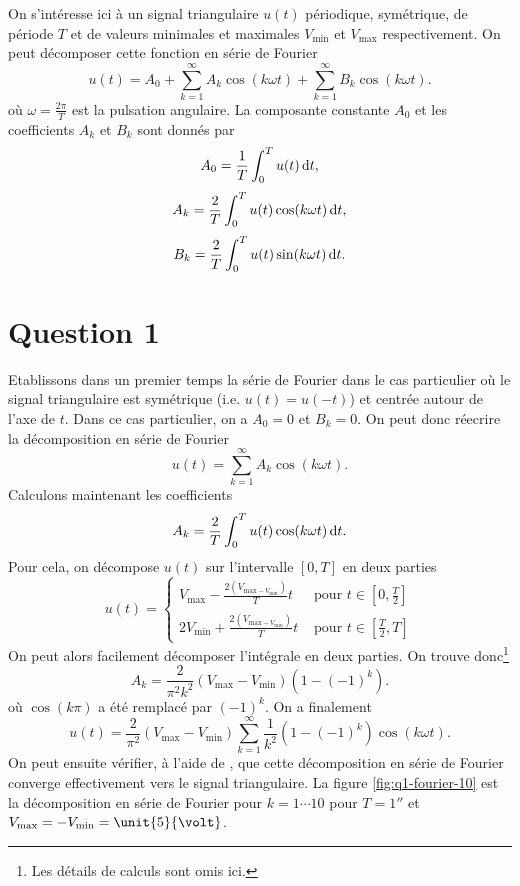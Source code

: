

On s'intéresse ici à un signal triangulaire $u(t)$
périodique, symétrique, de période $T$ et de valeurs 
minimales et maximales $V_{\text{min}}$ et $V_{\text{max}}$
respectivement. On peut décomposer cette fonction
en série de Fourier
\[ u(t) = A_0 + \sum_{k=1}^{\infty} A_k\cos(k\omega t)
+ \sum_{k=1}^{\infty} B_k\cos(k\omega t). \]
où $\omega = \frac{2\pi}{T}$ est la pulsation angulaire.
La composante constante $A_0$ et les coefficients $A_k$
et $B_k$ sont donnés par 
\[ A_0 = \frac{1}{T} \int_0^T u(t)\operatorname{d}\! t,\]
\[ A_k = \frac{2}{T} \int_0^T u(t)\cos(k\omega t)\operatorname{d}\! t,\]
\[ B_k = \frac{2}{T} \int_0^T u(t)\sin(k\omega t)\operatorname{d}\! t.\]

\section{Question 1}
Etablissons dans un premier temps la série de Fourier
dans le cas particulier où le signal triangulaire
est symétrique (i.e. $u(t) = u(-t)$) et centrée autour
de l'axe de $t$. Dans ce cas particulier, on a $A_0 = 0$
et $B_k = 0$. On peut donc réecrire la décomposition
en série de Fourier 
\[ u(t) = \sum_{k=1}^{\infty} A_k\cos(k\omega t).\]
Calculons maintenant les coefficients
\[ A_k = \frac{2}{T} \int_0^T u(t)\cos(k\omega t)\operatorname{d}\! t.\]
Pour cela, on décompose $u(t)$ sur l'intervalle $[0,T]$
en deux parties
\[ u(t) =
	\left\{
		\begin{array}{rl}
			V_{\text{max}} - \frac{2(V_{\text{max}-V_{\text{min}}})}{T}t 	
			&\text{ pour } t \in [0,\frac{T}{2}]  \\
			2V_{\text{min}} + \frac{2(V_{\text{max}-V_{\text{min}}})}{T}t 
			&\text{ pour }t \in [\frac{T}{2},T] 
		\end{array}
	\right.
\]
On peut alors facilement décomposer l'intégrale en deux
parties. On trouve donc\footnote{Les détails
de calculs sont omis ici.}
\[ A_k = \frac{2}{\pi^2k^2}(V_{\text{max}}-V_{\text{min}})
(1 - (-1)^k).\]
où $\cos(k\pi)$ a été remplacé par $(-1)^k$.
On a finalement
\[ u(t) = \frac{2}{\pi^2}(V_{\text{max}}-V_{\text{min}})
\sum_{k=1}^{\infty} \frac{1}{k^2}(1 - (-1)^k)\cos(k\omega t).\]
On peut ensuite vérifier, à l'aide de \matlab,
que cette décomposition en série de Fourier
converge effectivement vers le signal triangulaire.
La figure \ref{fig:q1-fourier-10} est la décomposition
en série de Fourier pour $k = 1\cdots10$ pour 
$T = \unit{1}{\second}$ et $V_{\text{max}} = 
-V_{\text{min}} = \unit{5}{\volt}$.

